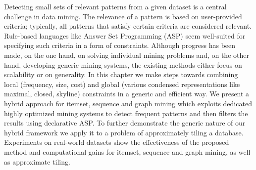   Detecting small sets of relevant patterns from a given dataset is a central challenge in data mining. The relevance of a pattern is based on user-provided criteria; typically, all patterns that satisfy certain criteria are considered relevant. Rule-based languages like Answer Set Programming (ASP) seem well-suited for specifying such criteria in a form of constraints.  Although progress has been made, on the one hand, on solving individual mining problems and, on the other hand, developing generic mining systems, the existing methods either focus on scalability or on generality.  In this chapter we make steps towards combining local (frequency, size, cost) and global (various condensed representations like maximal, closed, skyline) constraints in a generic and efficient way. We present a hybrid approach for itemset, sequence and graph mining which exploits dedicated highly optimized mining systems to detect frequent patterns and then filters the results using declarative ASP. To further demonstrate the generic nature of our hybrid framework we apply it to a problem of approximately tiling a database. Experiments on real-world datasets show the effectiveness of the proposed method and computational gains 
for itemset, sequence and graph mining, as well as approximate tiling. 

